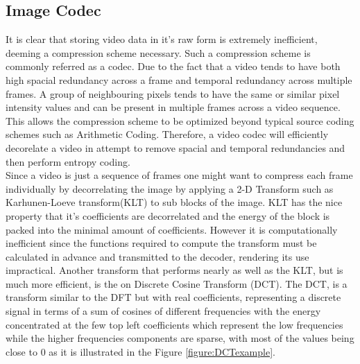 \documentclass[a4paper,11pt,oneside]{article}
\begin{document}
\subsection{Image Codec}
\indent It is clear that storing video data in it's raw form is extremely inefficient, deeming a compression scheme necessary. Such a compression scheme is commonly referred as a codec.
Due to the fact that a video tends to have both high spacial redundancy across a frame and temporal redundancy across multiple frames. A group of neighbouring pixels tends to have
the same or similar pixel intensity values and can be present in multiple frames across a video sequence. This allows the compression scheme to be optimized beyond typical source coding
schemes such as Arithmetic Coding. Therefore, a video codec will efficiently decorelate a video in attempt to remove spacial and temporal redundancies and then perform entropy coding.\\
\indent %
Since a video is just a sequence of frames one might want to compress each frame individually by decorrelating the image by applying a 2-D Transform such as Karhunen-Loeve transform(KLT) to sub blocks of the image. KLT has the nice property that it's coefficients are decorrelated and the energy of the block is packed into the minimal amount of coefficients. However it is computationally inefficient since the functions required to compute the transform must be calculated in advance and transmitted to the decoder, rendering its use impractical. Another transform that performs nearly as well as the KLT, but is much more efficient, is the on Discrete Cosine Transform (DCT). The DCT, is a transform similar to the DFT but with real
coefficients, representing a discrete signal in terms of a sum of cosines of different frequencies with the energy concentrated at the few top left coefficients which represent the low frequencies while the higher frequencies components are sparse, with most of the values being close to $0$ as it is illustrated in the Figure \ref{figure:DCTexample}.
\end{document}
